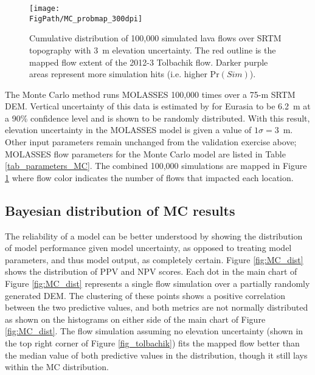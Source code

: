 		\begin{figure}
			\centering
			\texttt{[image: \\FigPath/MC\_probmap\_300dpi]}
			\caption[Cumulative distribution of 100,000 simulated lava flows over SRTM topography with 3~m elevation uncertainty]{Cumulative distribution of 100,000 simulated lava flows over SRTM topography with 3~m elevation uncertainty. The red outline is the mapped flow extent of the 2012-3 Tolbachik flow. Darker purple areas represent more simulation hits (i.e. higher $\text{Pr}(Sim)$).}
			\label{fig_MC_map}
		\end{figure}
		
		The Monte Carlo method runs MOLASSES 100,000 times over a 75-m SRTM DEM. Vertical uncertainty of this data is estimated by \citet{rodriguez2006global} for Eurasia to be 6.2~m at a 90\% confidence level and is shown to be randomly distributed. With this result, elevation uncertainty in the MOLASSES model is given a value of $1\sigma=3$~m. Other input parameters remain unchanged from the validation exercise above; MOLASSES flow parameters for the Monte Carlo model are listed in Table \ref{tab_parameters_MC}. The combined 100,000 simulations are mapped in Figure \ref{fig_MC_map} where flow color indicates the number of flows that impacted each location.
		

				
		\subsection{Bayesian distribution of MC results}
			The reliability of a model can be better understood by showing the distribution of model performance given model uncertainty, as opposed to treating model parameters, and thus model output, as completely certain.  Figure \ref{fig:MC_dist} shows the distribution of PPV and NPV scores. Each dot in the main chart of Figure \ref{fig:MC_dist} represents a single flow simulation over a partially randomly generated DEM. The clustering of these points shows a positive correlation between the two predictive values, and both metrics are not normally distributed as shown on the histograms on either side of the main chart of Figure \ref{fig:MC_dist}. The flow simulation assuming no elevation uncertainty (shown in the top right corner of Figure \ref{fig_tolbachik}) fits the mapped flow better than the median value of both predictive values in the distribution, though it still lays within the MC distribution.
			
